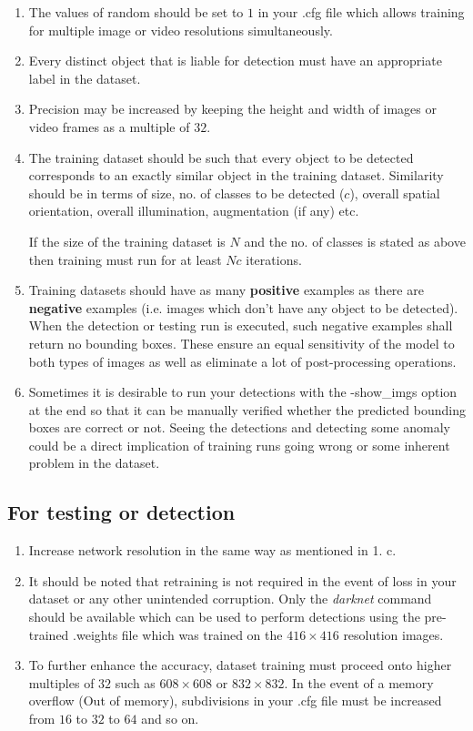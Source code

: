 \begin{enumerate}
  \item The values of {\selectfont random} should be set to $1$ in your  {\selectfont .cfg} file which allows training for multiple image or video resolutions simultaneously.
  \item Every distinct object that is liable for detection must have an appropriate label in the dataset.
  \item Precision may be increased by keeping the height and width of images or video frames as a multiple of $32$.
  \item The training dataset should be such that every object to be detected corresponds to an exactly similar object in the training dataset. Similarity should be in terms of size, no. of classes to be detected ($c$), overall spatial orientation, overall illumination, augmentation (if any) etc. \par

  If the size of the training dataset is $N$ and the no. of classes is stated as above then training must run for at least $Nc$ iterations.
  \item Training datasets should have as many \textbf{positive} examples as there are \textbf{negative} examples (i.e. images which don’t have any object to be detected). When the detection or testing run is executed, such negative examples shall return no bounding boxes. These ensure an equal sensitivity of the model to both types of images as well as eliminate a lot of post-processing operations.
  \item Sometimes it is desirable to run your detections with the {\selectfont -show\_imgs} option at the end so that it can be manually verified whether the predicted bounding boxes are correct or not. Seeing the detections and detecting some anomaly could be a direct implication of training runs going wrong or some inherent problem in the dataset.
\end{enumerate}


\subsection{For testing or detection}

\begin{enumerate}
  \item Increase network resolution in the same way as mentioned in 1. c.
  \item It should be noted that retraining is not required in the event of loss in your dataset or any other unintended corruption. Only the \textit{darknet} command should be available which can be used to perform detections using the pre-trained {\selectfont .weights} file which was trained on the $416 \times 416$ resolution images.
  \item To further enhance the accuracy, dataset training must proceed onto higher multiples of  $32$ such as $608 \times 608$ or $832 \times 832$. In the event of a memory overflow ({\selectfont Out of memory}), {\selectfont subdivisions} in your {\selectfont .cfg} file must be increased from $16$ to $32$ to $64$ and so on.
\end{enumerate}
